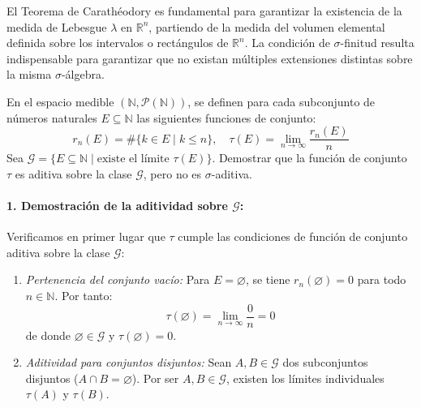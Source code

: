 \begin{observacion}
El Teorema de Carathéodory es fundamental para garantizar la existencia de la medida de Lebesgue $\lambda$ en $\mathbb{R}^n$, partiendo de la medida del volumen elemental definida sobre los intervalos o rectángulos de $\mathbb{R}^n$. La condición de $\sigma$-finitud resulta indispensable para garantizar que no existan múltiples extensiones distintas sobre la misma $\sigma$-álgebra.
\end{observacion}

\newpage
\seccionproblemas

\begin{problema}
En el espacio medible $(\mathbb{N}, \mathcal{P}(\mathbb{N}))$, se definen para cada subconjunto de números naturales $E \subseteq \mathbb{N}$ las siguientes funciones de conjunto:
\[
    r_n(E) = \#\{k \in E \mid k \le n\}, \quad \tau(E) = \lim_{n \to \infty} \frac{r_n(E)}{n}
\]
Sea $\mathcal{G} = \{ E \subseteq \mathbb{N} \mid \text{existe el límite } \tau(E) \}$. Demostrar que la función de conjunto $\tau$ es aditiva sobre la clase $\mathcal{G}$, pero no es $\sigma$-aditiva.

\tcblower

\paragraph{1. Demostración de la aditividad sobre $\mathcal{G}$:}

Verificamos en primer lugar que $\tau$ cumple las condiciones de función de conjunto aditiva sobre la clase $\mathcal{G}$:
\begin{enumerate}[label=\alph*)]
    \item \textit{Pertenencia del conjunto vacío:} Para $E = \varnothing$, se tiene $r_n(\varnothing) = 0$ para todo $n \in \mathbb{N}$. Por tanto:
    \[
        \tau(\varnothing) = \lim_{n \to \infty} \frac{0}{n} = 0
    \]
    de donde $\varnothing \in \mathcal{G}$ y $\tau(\varnothing) = 0$.

    \item \textit{Aditividad para conjuntos disjuntos:} Sean $A, B \in \mathcal{G}$ dos subconjuntos disjuntos ($A \cap B = \varnothing$). Por ser $A, B \in \mathcal{G}$, existen los límites individuales $\tau(A)$ y $\tau(B)$.
    

\end{enumerate}
\end{problema}

